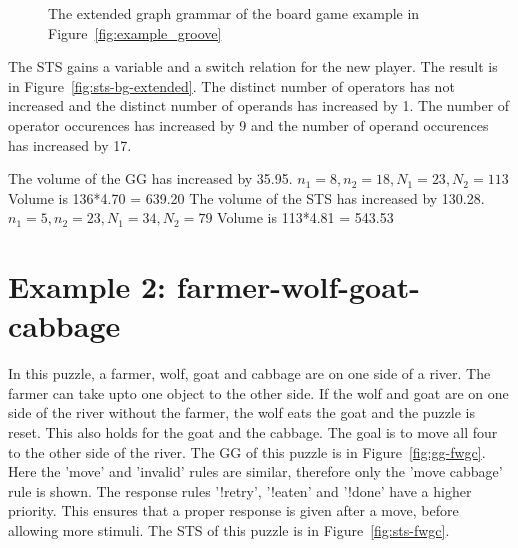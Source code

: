 \begin{figure}[ht]
  \begin{center}
    \hspace{20px}
  \end{center}
  \caption{The extended graph grammar of the board game example in Figure~\ref{fig:example_groove}}
  \label{fig:gg-bg-extended}
\end{figure}

The STS gains a variable and a switch relation for the new player. The result is in Figure~\ref{fig:sts-bg-extended}. The distinct number of operators has not increased and the distinct number of operands has increased by 1. The number of operator occurences has increased by 9 and the number of operand occurences has increased by 17.

The volume of the GG has increased by 35.95. $n_1 = 8, n_2 = 18, N_1 = 23, N_2 = 113$ Volume is 136*4.70 = 639.20
The volume of the STS has increased by 130.28. $n_1 = 5, n_2 = 23, N_1 = 34, N_2 = 79$ Volume is 113*4.81 = 543.53


\section{Example 2: farmer-wolf-goat-cabbage}
In this puzzle, a farmer, wolf, goat and cabbage are on one side of a river. The farmer can take upto one object to the other side. If the wolf and goat are on one side of the river without the farmer, the wolf eats the goat and the puzzle is reset. This also holds for the goat and the cabbage. The goal is to move all four to the other side of the river. The GG of this puzzle is in Figure~\ref{fig:gg-fwgc}. Here the 'move' and 'invalid' rules are similar, therefore only the 'move cabbage' rule is shown. The response rules '!retry', '!eaten' and '!done' have a higher priority. This ensures that a proper response is given after a move, before allowing more stimuli. The STS of this puzzle is in Figure~\ref{fig:sts-fwgc}.

